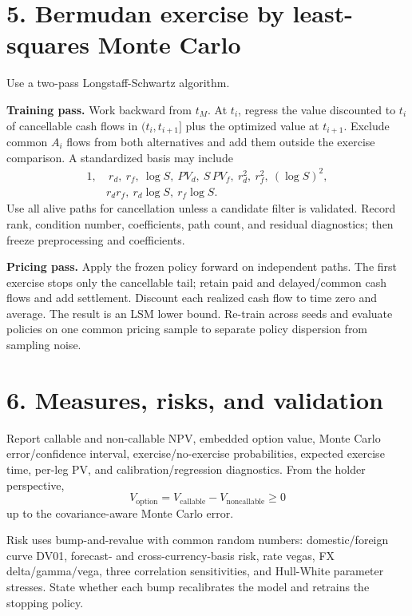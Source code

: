\documentclass[9pt,letterpaper]{extarticle}
\begin{document}
\section{5. Bermudan exercise by least-squares Monte Carlo}

Use a two-pass Longstaff-Schwartz algorithm.

\textbf{Training pass.} Work backward from $t_M$. At $t_i$, regress the value discounted to $t_i$ of cancellable cash flows in $(t_i,t_{i+1}]$ plus the optimized value at $t_{i+1}$. Exclude common $A_i$ flows from both alternatives and add them outside the exercise comparison. A standardized basis may include
\[
\begin{aligned}
1,&\ r_d,\ r_f,\ \log S,\ PV_d,\ S\,PV_f,\ r_d^2,\ r_f^2,\ (\log S)^2,\\
& r_dr_f,\ r_d\log S,\ r_f\log S.
\end{aligned}
\]
Use all alive paths for cancellation unless a candidate filter is validated. Record rank, condition number, coefficients, path count, and residual diagnostics; then freeze preprocessing and coefficients.

\textbf{Pricing pass.} Apply the frozen policy forward on independent paths. The first exercise stops only the cancellable tail; retain paid and delayed/common cash flows and add settlement. Discount each realized cash flow to time zero and average. The result is an LSM lower bound. Re-train across seeds and evaluate policies on one common pricing sample to separate policy dispersion from sampling noise.

\section{6. Measures, risks, and validation}

Report callable and non-callable NPV, embedded option value, Monte Carlo error/confidence interval, exercise/no-exercise probabilities, expected exercise time, per-leg PV, and calibration/regression diagnostics. From the holder perspective,
\[
  V_{\mathrm{option}}=V_{\mathrm{callable}}-V_{\mathrm{noncallable}}\ge0
\]
up to the covariance-aware Monte Carlo error.

Risk uses bump-and-revalue with common random numbers: domestic/foreign curve DV01, forecast- and cross-currency-basis risk, rate vegas, FX delta/gamma/vega, three correlation sensitivities, and Hull-White parameter stresses. State whether each bump recalibrates the model and retrains the stopping policy.
\end{document}
